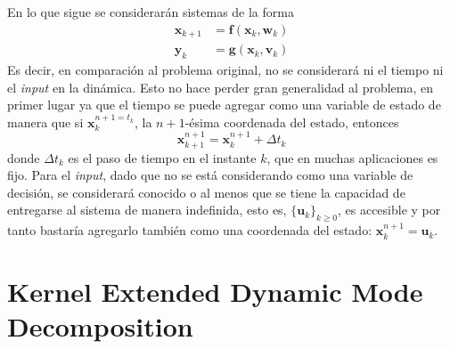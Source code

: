 En lo que sigue se considerarán sistemas de la forma
\begin{align*}
	\mathbf{x}_{k+1} &= \mathbf{f}( \mathbf{x}_k, \mathbf{w}_k) \\
	\mathbf{y}_k &= \mathbf{g}(\mathbf{x}_k, \mathbf{v}_k)
\end{align*}
Es decir, en comparación al problema original, no se considerará ni el tiempo ni el \textit{input} en la dinámica. Esto no hace perder gran generalidad al problema, en primer lugar ya que el tiempo se puede agregar como una variable de estado de manera que si $\mathbf{x}_{k}^{n+1 = t_k}$, la $n+1$-ésima coordenada del estado, entonces 
\begin{equation*}
    \mathbf{x}_{k+1}^{n+1} = \mathbf{x}_{k}^{n+1} + \Delta t_k
\end{equation*}
donde $\Delta t_k$ es el paso de tiempo en el instante $k$, que en muchas aplicaciones es fijo. Para el \textit{input}, dado que no se está considerando como una variable de decisión, se considerará conocido o al menos que se tiene la capacidad de entregarse al sistema de manera indefinida, esto es, $\{ \mathbf{u}_k \}_{k \geq 0}$, es accesible y por tanto bastaría agregarlo también como una coordenada del estado: $\mathbf{x}_{k}^{n+1} = \mathbf{u}_k$.
\section{Kernel Extended Dynamic Mode Decomposition}

